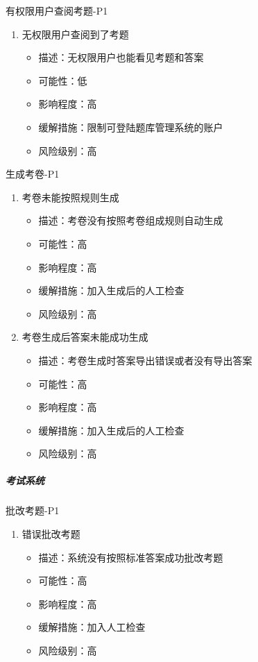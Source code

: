 \documentclass[hyperref, a4paper]{ctexart}
\providecommand{\tightlist}{%
  \setlength{\itemsep}{0pt}\setlength{\parskip}{0pt}}
\let\oldsubparagraph\subparagraph
\renewcommand{\subparagraph}[1]{\oldsubparagraph{#1}\mbox{}}
\begin{document}
有权限用户查阅考题-P1

\begin{enumerate}
\def\labelenumi{\arabic{enumi}.}
\tightlist
\item
  无权限用户查阅到了考题

  \begin{itemize}
  \tightlist
  \item
    描述：无权限用户也能看见考题和答案
  \item
    可能性：低
  \item
    影响程度：高
  \item
    缓解措施：限制可登陆题库管理系统的账户
  \item
    风险级别：高
  \end{itemize}
\end{enumerate}

生成考卷-P1

\begin{enumerate}
\def\labelenumi{\arabic{enumi}.}
\tightlist
\item
  考卷未能按照规则生成

  \begin{itemize}
  \tightlist
  \item
    描述：考卷没有按照考卷组成规则自动生成
  \item
    可能性：高
  \item
    影响程度：高
  \item
    缓解措施：加入生成后的人工检查
  \item
    风险级别：高
  \end{itemize}
\item
  考卷生成后答案未能成功生成

  \begin{itemize}
  \tightlist
  \item
    描述：考卷生成时答案导出错误或者没有导出答案
  \item
    可能性：高
  \item
    影响程度：高
  \item
    缓解措施：加入生成后的人工检查
  \item
    风险级别：高
  \end{itemize}
\end{enumerate}

\hypertarget{ux8003ux8bd5ux7cfbux7edf-3}{%
\subparagraph{考试系统}\label{ux8003ux8bd5ux7cfbux7edf-3}}

批改考题-P1

\begin{enumerate}
\def\labelenumi{\arabic{enumi}.}
\tightlist
\item
  错误批改考题

  \begin{itemize}
  \tightlist
  \item
    描述：系统没有按照标准答案成功批改考题
  \item
    可能性：高
  \item
    影响程度：高
  \item
    缓解措施：加入人工检查
  \item
    风险级别：高
  \end{itemize}
\end{enumerate}
\end{document}
